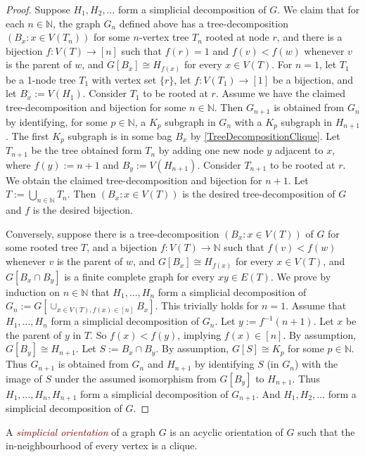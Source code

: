 \documentclass[a4paper,11pt]{article}
\newcommand{\defn}[1]{\textcolor{Maroon}{\emph{#1}}\index{#1}}
\theoremstyle{plain}
\theoremstyle{definition}
\newcommand{\NN}{\mathbb{N}}
\begin{document}
\begin{proof}
Suppose $H_1,H_2, \ldots$ form a simplicial decomposition of $G$.
We claim that for each $n\in\NN$, the graph $G_n$ defined above has a tree-decomposition $(B_x:x\in V(T_n))$ for some  $n$-vertex tree $T_n$ rooted at node $r$, and there is a bijection $f:V(T)\to[n]$ such that $f(r)=1$ and $f(v)<f(w)$ whenever $v$ is the parent of $w$, and
$G[B_x]\cong H_{f(x)}$ for every $x\in V(T)$. 
For $n=1$, let $T_1$ be a 1-node tree $T_1$ with vertex set $\{r\}$, let $f:V(T_1)\to[1]$ be a bijection, and let $B_x:=V(H_1)$. Consider $T_1$ to be rooted at $r$. Assume we have the claimed tree-decomposition and bijection for some $n\in\NN$. 
Then $G_{n+1}$ is obtained from $G_n$ by identifying, for some $p\in\NN$, a $K_p$ subgraph in $G_n$ with a $K_p$ subgraph in $H_{n+1}$. The first $K_p$ subgraph is in some bag $B_x$ by \cref{TreeDecompositionClique}. Let $T_{n+1}$ be the tree obtained form $T_n$ by adding one new node $y$ adjacent to $x$, where $f(y):=n+1$ and $B_y:=V(H_{n+1})$. Consider $T_{n+1}$ to be rooted at $r$. We obtain the claimed tree-decomposition and bijection for $n+1$. Let $T:=\bigcup_{n\in\NN} T_n$. Then $(B_x:x\in V(T))$ is the desired tree-decomposition of $G$ and $f$ is the desired bijection.

Conversely, suppose there is a tree-decomposition $(B_x:x\in V(T))$ of $G$ for some rooted tree $T$, and a bijection $f:V(T)\to\NN$ such that 
$f(v)<f(w)$ whenever $v$ is the parent of $w$, and
$G[B_x] \cong H_{f(x)}$ for every $x\in V(T)$, and
$G[B_x \cap B_y]$ is a finite complete graph for every $xy\in E(T)$.
We prove by induction on $n\in\NN$ that $H_1,\dots,H_n$ form a simplicial decomposition of $G_n:=G[ \cup_{x\in V(T),f(x)\in[n]} B_x ]$. This trivially holds for $n=1$. Assume that $H_1,\dots,H_n$ form a simplicial decomposition of $G_n$. Let $y:= f^{-1}(n+1)$. Let $x$ be the parent of $y$ in $T$. So $f(x)<f(y)$, implying $f(x)\in[n]$. By assumption, $G[B_y]\cong H_{n+1}$. Let $S:=B_x \cap B_y$. By assumption, $G[S]\cong K_p$ for some $p\in\NN$. Thus $G_{n+1}$ is obtained from $G_n$ and $H_{n+1}$ by identifying $S$ (in $G_n$) with the image of $S$ under the assumed isomorphism from $G[B_y]$ to $H_{n+1}$. Thus $H_1,\dots,H_n,H_{n+1}$ form a simplicial decomposition of $G_{n+1}$. And $H_1,H_2,\dots$ form a simplicial decomposition of $G$. 
\end{proof}

A \defn{simplicial orientation} of a graph $G$ is an acyclic orientation of $G$ such that the in-neighbourhood of every vertex is a clique.  
\end{document}

